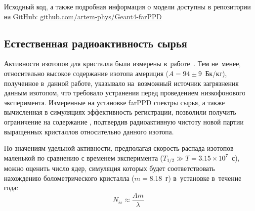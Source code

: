 \documentclass[a4paper,article,14pt]{extarticle}
\begin{document}
Исходный код, а также подробная информация о модели доступны в репозитории на GitHub: \href{https://github.com/artem-phys/Geant4-farPPD}{github.com/artem-phys/Geant4-farPPD}

\subsection{Естественная радиоактивность сырья}
Активности изотопов для кристалла {\TmAlO} были измерены в~работе~\cite{test_bolometric_tm}.
Тем не~менее, относительно высокое содержание изотопа америция {\Am} ($A = 94 \pm 9$~Бк/кг), полученное в~данной работе, указывало на~возможный источник загрязнения данным изотопом, что требовало устранения перед проведением низкофонового эксперимента.
Измеренные на установке farPPD спектры сырья, а также вычисленная в симуляциях эффективность регистрации, позволили получить ограничение на содержание {\Am}, подтвердив радиоактивную чистоту новой партии выращенных кристаллов относительно данного изотопа.

По значениям удельной активности, предполагая скорость распада изотопов маленькой по сравнению с временем эксперимента ($T_{1/2} \gg T = 3.15 \times 10^7$~с), можно оценить число ядер, симуляция которых будет соответствовать нахождению болометрического кристалла ($m = 8.18$~г) в~установке в~течение года:
\begin{equation}
    N_{is} \approx \frac{A m}{\lambda}
\end{equation}

\begin{table}[]
    \centering
    \caption{Активность нуклидов в образце и полное число событий за год, соответствующее данной активности}\label{tab:sources}
\end{table}
\end{document}

